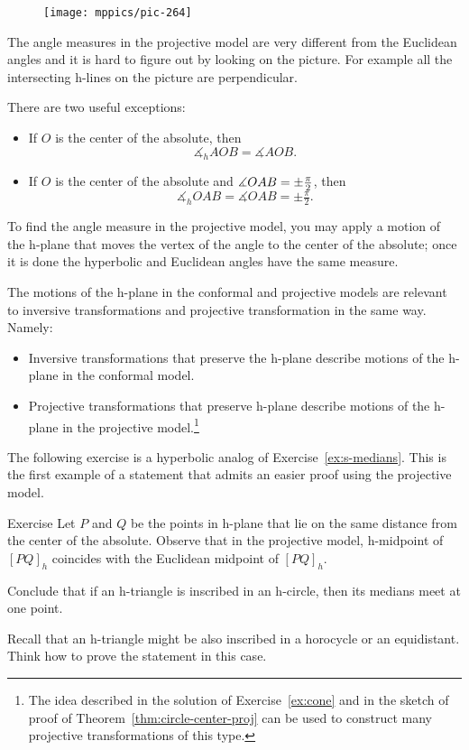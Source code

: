 {

\begin{wrapfigure}{r}{36mm}
\vskip-3mm
\centering
\texttt{[image: mppics/pic-264]}
\end{wrapfigure}

The angle measures in the projective model are very different from the Euclidean angles and it is hard to figure out by looking on the picture.\label{klein-angles}
For example all the intersecting h-lines on the picture 
are perpendicular.

}

There are two useful exceptions:

\begin{itemize}
\item If $O$ is the center of the absolute, then 
$$\measuredangle_hAOB=\measuredangle AOB.$$
\item If $O$ is the center of the absolute 
and 
$\measuredangle OAB\z=\pm\tfrac\pi2$, then 
$$\measuredangle_h OAB=\measuredangle OAB=\pm\tfrac\pi2.$$
\end{itemize}

To find the angle measure in the projective model,
you may apply a motion of the h-plane that moves 
the vertex of the angle to the center of the absolute;
once it is done the hyperbolic and Euclidean angles have the same measure.

The motions of the h-plane in the conformal and projective models are relevant to inversive transformations and projective transformation in the same way.
Namely: 
\begin{itemize}
\item Inversive transformations that preserve the h-plane describe motions of the h-plane in the conformal model.
\item Projective transformations that preserve h-plane describe motions of the h-plane in the projective model.\footnote{The idea described in the solution of Exercise~\ref{ex:cone} and in the sketch of proof of Theorem~\ref{thm:circle-center-proj} can be used to construct many projective transformations of this type.}
\end{itemize}

The following exercise is a hyperbolic analog of Exercise~\ref{ex:s-medians}. 
This is the first example of a statement that admits an easier proof using  the projective model.

\begin{thm}{Exercise}\label{ex:h-median}
Let $P$ and $Q$ be the points in h-plane that lie on the same distance from the center of the absolute.
Observe that in the projective model, h-midpoint of $[PQ]_h$ coincides with the Euclidean midpoint of $[PQ]_h$.

Conclude that if an h-triangle is inscribed in an h-circle, then its medians meet at one point.

Recall that an h-triangle might be also inscribed in a horocycle or an equidistant.
Think how to prove the statement in this case.
\end{thm}

